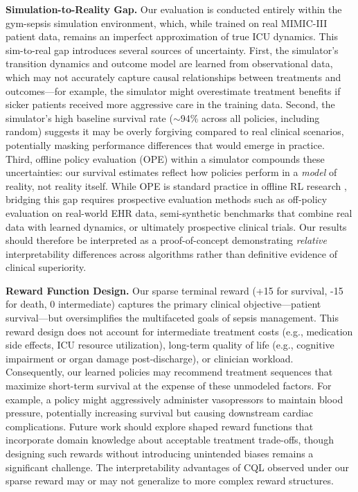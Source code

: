 \textbf{Simulation-to-Reality Gap.} Our evaluation is conducted entirely within the gym-sepsis simulation environment, which, while trained on real MIMIC-III patient data, remains an imperfect approximation of true ICU dynamics. This sim-to-real gap introduces several sources of uncertainty. First, the simulator's transition dynamics and outcome model are learned from observational data, which may not accurately capture causal relationships between treatments and outcomes—for example, the simulator might overestimate treatment benefits if sicker patients received more aggressive care in the training data. Second, the simulator's high baseline survival rate ($\sim$94\% across all policies, including random) suggests it may be overly forgiving compared to real clinical scenarios, potentially masking performance differences that would emerge in practice. Third, offline policy evaluation (OPE) within a simulator compounds these uncertainties: our survival estimates reflect how policies perform in a \textit{model} of reality, not reality itself. While OPE is standard practice in offline RL research \citep{levine2020offline}, bridging this gap requires prospective evaluation methods such as off-policy evaluation on real-world EHR data, semi-synthetic benchmarks that combine real data with learned dynamics, or ultimately prospective clinical trials. Our results should therefore be interpreted as a proof-of-concept demonstrating \textit{relative} interpretability differences across algorithms rather than definitive evidence of clinical superiority.

\textbf{Reward Function Design.} Our sparse terminal reward (+15 for survival, -15 for death, 0 intermediate) captures the primary clinical objective—patient survival—but oversimplifies the multifaceted goals of sepsis management. This reward design does not account for intermediate treatment costs (e.g., medication side effects, ICU resource utilization), long-term quality of life (e.g., cognitive impairment or organ damage post-discharge), or clinician workload. Consequently, our learned policies may recommend treatment sequences that maximize short-term survival at the expense of these unmodeled factors. For example, a policy might aggressively administer vasopressors to maintain blood pressure, potentially increasing survival but causing downstream cardiac complications. Future work should explore shaped reward functions that incorporate domain knowledge about acceptable treatment trade-offs, though designing such rewards without introducing unintended biases remains a significant challenge. The interpretability advantages of CQL observed under our sparse reward may or may not generalize to more complex reward structures.

